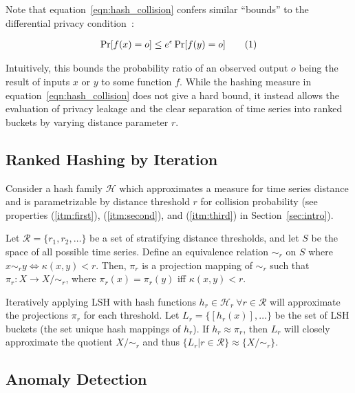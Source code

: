 \documentclass[a4paper]{article}
\newcommand\numberthis{\addtocounter{equation}{1}\tag{\theequation}}
\begin{document}
Note that equation~\ref{eqn:hash_collision} confers similar ``bounds'' to the differential privacy condition~\cite{dwork2006}:

\begin{align*}
    \Pr[f(x) = o] \le e^{\epsilon} \Pr[f(y) = o] \numberthis
    \label{eqn:differential_privacy}
\end{align*}

Intuitively, this bounds the probability ratio of an observed output $o$ being the result of inputs $x$ or $y$ to some function $f$.
While the hashing measure in equation~\ref{eqn:hash_collision} does not give a hard bound, it instead allows the evaluation of privacy leakage and the clear separation of time series into ranked buckets by varying distance parameter $r$.

\subsection{Ranked Hashing by Iteration}
\label{subsec:ranked_lsh}

Consider a hash family $\mathcal{H}$ which approximates a measure for time series distance and is parametrizable by distance threshold $r$ for collision probability (see properties (\ref{itm:first}), (\ref{itm:second}), and (\ref{itm:third}) in Section~\ref{sec:intro}).

Let $\mathcal{R} = \{r_1, r_2, \ldots\}$ be a set of stratifying distance thresholds, and let $S$ be the space of all possible time series.
Define an equivalence relation $\sim_r$ on $S$ where $x \sim_r y \Leftrightarrow \kappa(x,y) < r$.
Then, $\pi_r$ is a projection mapping of $\sim_r$ such that $\pi_r \colon X \rightarrow X/\sim_r$, where $\pi_r(x) = \pi_r(y)$ iff $\kappa(x,y) < r$.

Iteratively applying LSH with hash functions $h_r \in \mathcal{H}_r~\forall r\in \mathcal{R}$ will approximate the projections $\pi_r$ for each threshold.
Let $L_r = \{[h_r(x)], \ldots \}$ be the set of LSH buckets (the set unique hash mappings of $h_r$).
If $h_r \approx \pi_r$, then $L_r$ will closely approximate the quotient $X/\sim_r$ and thus $\{L_r | r \in \mathcal{R} \} \approx \{X/\sim_r\}$.

\subsection{Anomaly Detection}
\label{subsec:anomaly_detection}
\end{document}
